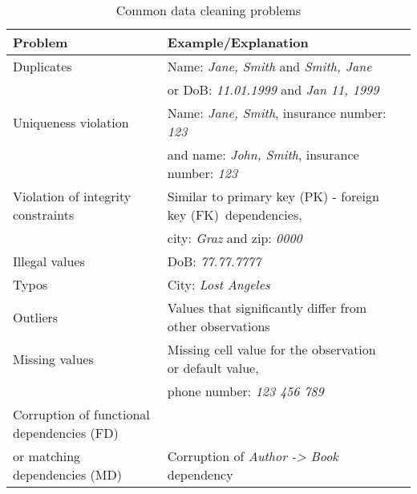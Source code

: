 \begin{table}
\centering
\begin{adjustbox}{width=1\textwidth}
    \begin{tabular}{ |l|l|l| }
      \hline
      Problem & Example/Explanation\\
      \hline
      
      Duplicates & Name: \emph{Jane, Smith} and \emph{Smith, Jane}\\&or DoB: \emph{11.01.1999} and \emph{Jan 11, 1999}\\
      
      \hline
     Uniqueness violation & Name: \emph{Jane, Smith}, insurance number: \emph{123}\\& and name: \emph{John, Smith}, insurance number: \emph{123}\\
      
      \hline
      Violation of integrity constraints & Similar to primary key (PK) - foreign key (FK)\ dependencies,\\&city: \emph{Graz} and zip: \emph{0000}\\
      
      \hline
      Illegal values & DoB: \emph{77.77.7777} \\
      
      \hline
      Typos & City: \emph{Lost Angeles} \\
      
      \hline
      Outliers & Values that significantly differ from other observations \\
      
      \hline
      Missing values & Missing cell value for the observation or default value,\\& phone number: \emph{123 456 789} \\
      
      \hline
      Corruption of functional dependencies (FD)\\ or matching dependencies (MD) & Corruption of \emph{Author -> Book} dependency \\
      \hline
    \end{tabular}
    
\end{adjustbox}
\caption{\label{tab:dc_problems} Common data cleaning problems}
\end{table}
